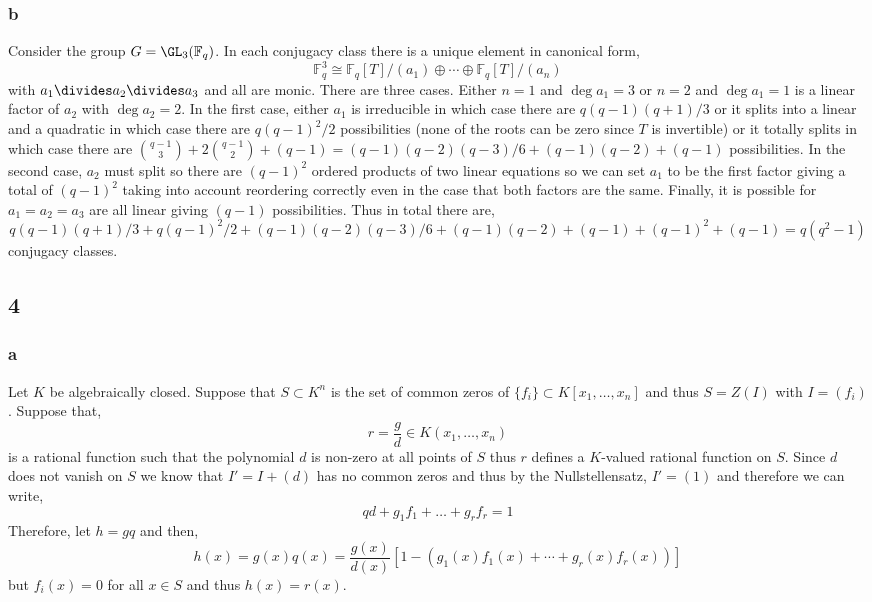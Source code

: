 \documentclass[12pt]{article}
\renewcommand{\F}{\mathbb{F}}
\begin{document}
\subsubsection{b}

Consider the group $G = \GL_{3}(\F_q)$. In each conjugacy class there is a unique element in canonical form,
\[ \F_q^3 \cong \F_q[T]/(a_1) \oplus \cdots \oplus \F_q[T]/(a_n) \]
with $a_1 \divides a_2 \divides a_3$ and all are monic. There are three cases. Either $n = 1$ and $\deg{a_1} = 3$ or $n = 2$ and $\deg{a_1} = 1$ is a linear factor of $a_2$ with $\deg{a_2} = 2$. In the first case, either $a_1$ is irreducible in which case there are $q(q-1)(q+1)/3$ or it splits into a linear and a quadratic in which case there are $q(q-1)^2/2$ possibilities (none of the roots can be zero since $T$ is invertible) or it totally splits in which case there are ${ q - 1 \choose 3 } + 2 { q - 1 \choose 2} + (q-1) = (q - 1)(q - 2)(q - 3) / 6 + (q - 1) (q-2) + (q-1)$ possibilities. In the second case, $a_2$ must split so there are $(q-1)^2$ ordered products of two linear equations so we can set $a_1$ to be the first factor giving a total of $(q-1)^2$ taking into account reordering correctly even in the case that both factors are the same. Finally, it is possible for $a_1 = a_2 = a_3$ are all linear giving $(q-1)$ possibilities. Thus in total there are,
\[  q(q-1)(q+1)/3 + q(q-1)^2/2 + (q - 1)(q - 2)(q - 3) / 6 + (q - 1)(q-2) + (q-1) +  (q-1)^2 + (q-1)  = q(q^2 - 1) \]
conjugacy classes.

\subsection{4}

\subsubsection{a}

Let $K$ be algebraically closed. Suppose that $S \subset K^n$ is the set of common zeros of $\{ f_i \} \subset K[x_1, \dots, x_n]$ and thus $S = Z(I)$ with $I = (f_i)$. Suppose that,
\[ r = \frac{g}{d} \in K(x_1, \dots, x_n) \]
is a rational function such that the polynomial $d$ is non-zero at all points of $S$ thus $r$ defines a $K$-valued rational function on $S$. Since $d$ does not vanish on $S$ we know that $I' = I + (d)$ has no common zeros and thus by the Nullstellensatz, $I' = (1)$ and therefore we can write,
\[ q d + g_1 f_1 + \dots + g_r f_r = 1 \]
Therefore, let $h = g q$ and then,
\[ h(x) = g(x) q(x) = \frac{g(x)}{d(x)} [1 - (g_1(x) f_1(x) + \cdots + g_r(x) f_r(x))] \]
but $f_i(x) = 0$ for all $x \in S$ and thus $h(x) = r(x)$. 
\end{document}
